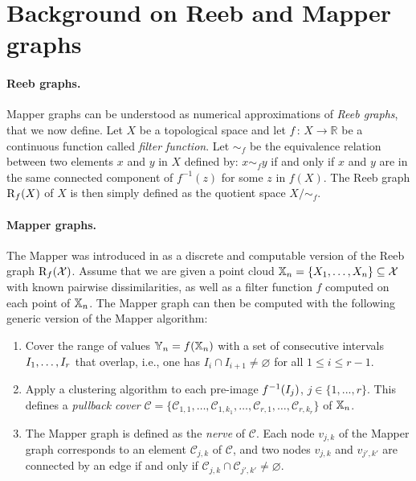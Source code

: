 \section{Background on Reeb and Mapper graphs}\label{sec:background}

\paragraph*{Reeb graphs.} Mapper graphs can be understood as numerical approximations of {\em Reeb graphs}, that we now define.
Let $X$ be a topological space and let $f\,:\,X\rightarrow \mathbb{R}$ be a continuous %
function called \emph{filter function}. Let $\sim_{f}$ be the equivalence relation between two elements $x$ and $y$ in $X$ defined by: $x\sim_{f} y$ if and only if $x$ and $y$ are in the same connected component of $f^{-1}(z)$ for some $z$ in $f(X)$. 
 The Reeb graph ${\mathrm R}_f(X)$ of  $X$ %
is then simply defined as the quotient space $X/\sim_{f}$.

\paragraph*{Mapper graphs.} The Mapper was introduced in \cite{singh2007topological} as a discrete and computable version of the Reeb graph ${\mathrm R}_f({\mathcal X})$. 
Assume that we are given a point cloud 
$\mathbb{X}_n= \{X_1,\dots,X_n\}\subseteq {\mathcal X}$ with known pairwise dissimilarities, as well as  
a filter function $f$ %
computed on each point of  $\mathbb{X}_n$. The Mapper graph can then be computed with the following
generic version of the Mapper algorithm:
\begin{enumerate}
\item Cover the range of values $\mathbb{Y}_n = f(\mathbb{X}_n)$ with a set of consecutive intervals $I_1,\dots, I_r$  that overlap, i.e., one has $I_i\cap I_{i+1}\neq \varnothing$ for all $1\leq i \leq r-1$.
\item Apply a clustering algorithm to each pre-image $f^{-1}(I_j)$, $j\in\{1,...,r\}$. This defines a {\em pullback cover}
$\mathcal{C}=\{\mathcal{C}_{1,1},\dots,\mathcal{C}_{1,k_1},\dots,\mathcal C_{r,1},\dots,\mathcal{C}_{r,k_r}\}$ of %
$\mathbb{X}_n$. 
\item The Mapper graph is defined as the {\em nerve} of $\mathcal{C}$. Each node $v_{j,k}$ of the Mapper graph corresponds to an element $\mathcal{C}_{j,k}$ of $\mathcal C$, 
and two nodes $v_{j,k}$ and $v_{j',k'}$ are connected by an edge if and only if  $\mathcal{C}_{j,k} \cap \mathcal{C}_{j',k'} \neq \varnothing$.
\end{enumerate} 
 
